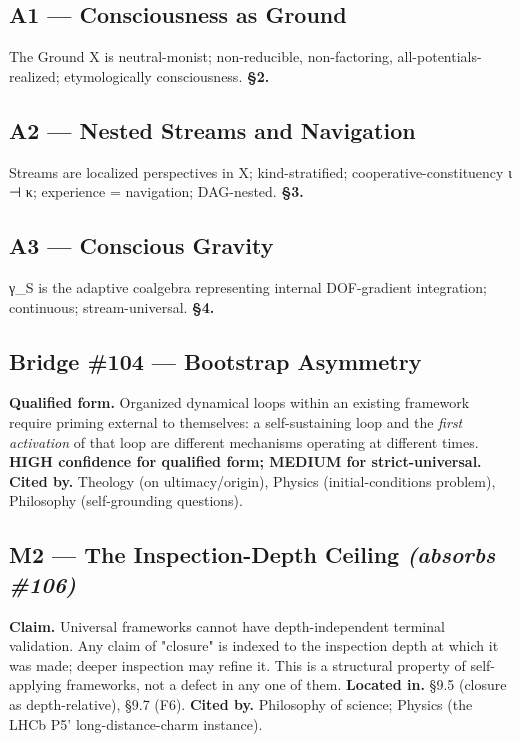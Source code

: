 \documentclass[11pt, openany]{book}
\begin{document}
\subsection{A1 --- Consciousness as Ground}
The Ground X is neutral-monist; non-reducible, non-factoring, all-potentials-realized; etymologically consciousness.
\textbf{§2.}

\subsection{A2 --- Nested Streams and Navigation}
Streams are localized perspectives in X; kind-stratified; cooperative-constituency ι ⊣ κ; experience = navigation; DAG-nested.
\textbf{§3.}

\subsection{A3 --- Conscious Gravity}
γ\_\allowbreak{}S is the adaptive coalgebra representing internal DOF-gradient integration; continuous; stream-universal.
\textbf{§4.}

\subsection{Bridge \#104 --- Bootstrap Asymmetry}
\textbf{Qualified form.} Organized dynamical loops within an existing framework require priming external to themselves: a self-sustaining loop and the \textit{first activation} of that loop are different mechanisms operating at different times.
\textbf{HIGH confidence for qualified form; MEDIUM for strict-universal.}
\textbf{Cited by.} Theology (on ultimacy/origin), Physics (initial-conditions problem), Philosophy (self-grounding questions).

\subsection{M2 --- The Inspection-Depth Ceiling \textit{(absorbs \#106)}}
\textbf{Claim.} Universal frameworks cannot have depth-independent terminal validation. Any claim of "closure" is indexed to the inspection depth at which it was made; deeper inspection may refine it. This is a structural property of self-applying frameworks, not a defect in any one of them.
\textbf{Located in.} §9.5 (closure as depth-relative), §9.7 (F6).
\textbf{Cited by.} Philosophy of science; Physics (the LHCb P5' long-distance-charm instance).
\end{document}
